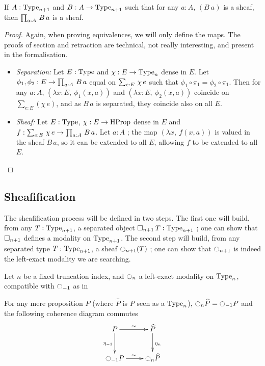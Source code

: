 \begin{prop}\label{prop:sheaf-forall}
  If $A:\operatorname{Type}_{n+1}$ and $B:A \to \operatorname{Type}_{n+1}$ such that for any
  $a:A$, $(B~a)$ is a sheaf, then $\prod_{a:A}\, B\, a$ is a sheaf.
\end{prop}
\begin{proof}
  Again, when proving equivalences, we will only define the maps. The
  proofs of section and retraction are technical, not really
  interesting, and present in the formalisation.
  \begin{itemize}
  \item {\em Separation:} Let $E:\operatorname{Type}$ and $\chi:E \to \operatorname{Type}_n$ dense
    in $E$. Let $\phi_1,\phi_2:E\to \prod_{a:A}\, B\, a$ equal on
    $\sum_{e:E}\, \chi\, e$ \ie{} such that $\phi_1\circ \pi_1 = \phi_2\circ
    \pi_1$.
    Then for any $a:A$, $(\lambda x:E,~\phi_1(x, a))$
    and $(\lambda x:E,~\phi_2(x,a))$
    coincide on $\sum_{e:E}(\chi\, e)$, and as $B\, a$ is separated,
    they coincide also on all $E$.
  \item {\em Sheaf:} Let $E:\operatorname{Type}$, $\chi:E\to \operatorname{HProp}$ dense in $E$ and
    $f:\sum_{e:E}\, \chi\, e\to \prod_{a:A}\, B\,a$. Let $a:A$ ; the
    map $(\lambda x,~f(x,a))$ is valued in the sheaf $B\, a$, so it
    can be extended to all $E$, allowing $f$ to be extended to all
    $E$.
  \end{itemize}
\end{proof}

\subsection{Sheafification}
\label{ssec:sheafification}

The sheafification process will be defined in two steps. The first
one will build, from any $T:\operatorname{Type}_{n+1}$, a separated object $\mathop{\square_{n+1}}
T:\operatorname{Type}_{n+1}$ ; one can show that $\mathop{\square_{n+1}}$ defines a modality on
$\operatorname{Type}_{n+1}$. The second step will build, from any separated type
$T:\operatorname{Type}_{n+1}$, a sheaf $\ocircle_{n+1}(T)$ ; one can show that
$\ocircle_{n+1}$ is indeed the left-exact modality we are searching.

Let $n$ be a fixed truncation index, and $\ocircle_n$ a left-exact
modality on $\operatorname{Type}_n$, compatible with $\ocircle_{-1}$ as in
\begin{cond}\label{cond:hprop}
  For any mere proposition $P$ (where $\widehat P$ is $P$ seen as a
  $\operatorname{Type}_n$),  $\ocircle_n \widehat P = \ocircle_{-1} P$ and the
  following coherence diagram commutes
  \[\xymatrix{
    P \ar@{->}^{\sim}[r] \ar[d]_{\eta_{-1}} & \widehat P \ar[d]^{\eta_n} \\
    \modal_{-1} P \ar@{->}^{\sim}[r] & \modal_n \widehat P 
  }\]
\end{cond}

